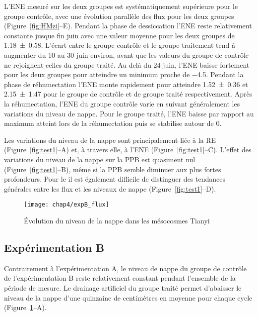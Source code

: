 L'ENE mesuré sur les deux groupes est systématiquement supérieure pour le groupe contrôle, avec une évolution parallèle des flux pour les deux groupes (Figure~\ref{fig:HMzi}--E).
Pendant la phase de dessiccation l'ENE reste relativement constante jusque fin juin avec une valeur moyenne pour les deux groupes de \SI{1.18(058)}{\uml}.
L'écart entre le groupe contrôle et le groupe traitement tend à augmenter du 10 au 30 juin environ, avant que les valeurs du groupe de contrôle ne rejoignent celles du groupe traité.
Au delà du 24 juin, l'ENE baisse fortement pour les deux groupes pour atteindre un minimum proche de \SI{-4.5}{\uml}.
Pendant la phase de réhumectation l'ENE monte rapidement pour atteindre \num{1.52(036)} et \SI{2.15(147)}{\uml} pour le groupe de contrôle et de groupe traité respectivement.
Après la réhumectation, l'ENE du groupe contrôle varie en suivant généralement les variations du niveau de nappe.
Pour le groupe traité, l'ENE baisse par rapport au maximum atteint lors de la réhumectation puis se stabilise autour de 0.

Les variations du niveau de la nappe sont principalement liée à la RE (Figure~\ref{fig:test1}--A) et, à travers elle, à l'ENE (Figure~\ref{fig:test1}--C).
L'effet des variations du niveau de la nappe sur la PPB est quasiment nul (Figure~\ref{fig:test1}--B), même si la PPB semble diminuer aux plus fortes profondeurs.
Pour le \chh il est également difficile de distinguer des tendances générales entre les flux et les niveaux de nappe (Figure~\ref{fig:test1}--D).

\begin{figure}
\centering
\texttt{[image: chap4/expB\_flux]}
\caption{Évolution du niveau de la nappe dans les mésocosmes Tianyi}
\label{fig:HMty}
\end{figure}

\subsection{Expérimentation B}

Contrairement à l'expérimentation A, le niveau de nappe du groupe de contrôle de l'expérimentation B reste relativement constant pendant l'ensemble de la période de mesure.
Le drainage artificiel du groupe traité permet d'abaisser le niveau de la nappe d'une quinzaine de centimètres en moyenne pour chaque cycle (Figure~\ref{fig:HMty}--A).

